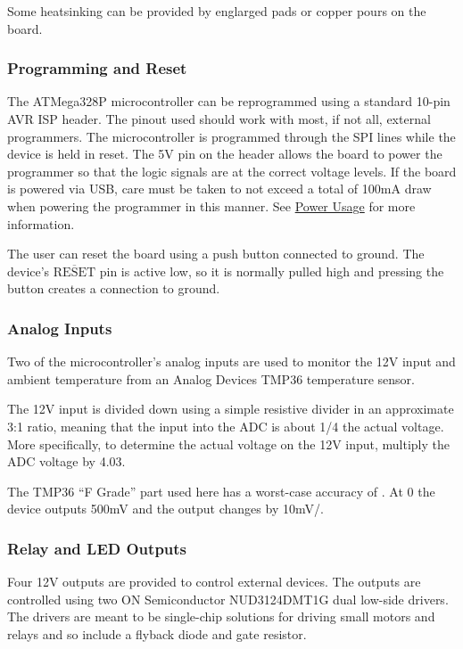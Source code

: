 \documentclass{article}
\newcommand{\textoverline}[1]{$\overline{\mbox{#1}}$}
\begin{document}
Some heatsinking can be provided by englarged pads or copper pours on the board.

\subsubsection{Programming and Reset} \label{sssec:ProgReset}
The ATMega328P microcontroller can be reprogrammed using a standard 10-pin AVR ISP header.  The
pinout used should work with most, if not all, external programmers.  The microcontroller is
programmed through the SPI lines while the device is held in reset.  The 5V pin on the header allows
the board to power the programmer so that the logic signals are at the correct voltage levels.  If
the board is powered via USB, care must be taken to not exceed a total of 100mA draw when powering
the programmer in this manner.  See \hyperref[ssec:PowerUsage]{Power Usage} for more information.

The user can reset the board using a push button connected to ground.  The device's
\textoverline{RESET} pin is active low, so it is normally pulled high and pressing the button
creates a connection to ground.

\subsubsection{Analog Inputs} \label{sssec:AnalogIn}
Two of the microcontroller's analog inputs are used to monitor the 12V input and ambient temperature
from an Analog Devices TMP36 temperature sensor.

The 12V input is divided down using a simple resistive divider in an approximate 3:1 ratio, meaning that the
input into the ADC is about 1/4 the actual voltage.  More specifically, to determine the actual
voltage on the 12V input, multiply the ADC voltage by 4.03.

The TMP36 ``F Grade'' part used here has a worst-case accuracy of \textcelsius{}.  At
0\textcelsius{} the device outputs 500mV and the output changes by 10mV/\textcelsius{}.

\subsubsection{Relay and LED Outputs} \label{sssec:RelayLED} 
Four 12V outputs are provided to control external devices.  The outputs are controlled using two ON
Semiconductor NUD3124DMT1G dual low-side drivers.  The drivers are meant to be single-chip solutions
for driving small motors and relays and so include a flyback diode and gate resistor.
\end{document}
